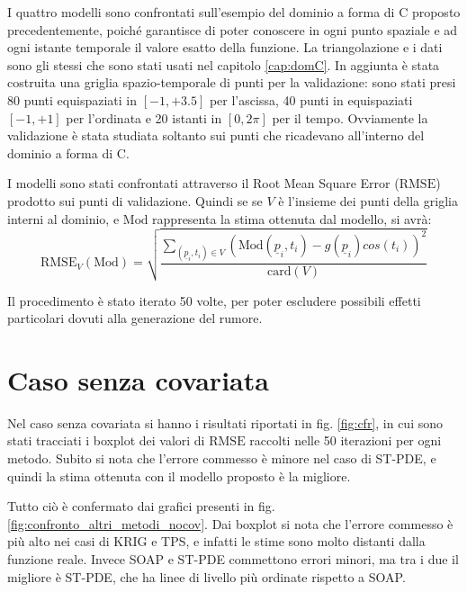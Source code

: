 \documentclass[a4paper,11pt,twoside,openright]{book}							%
\begin{document}
I quattro modelli sono confrontati sull'esempio del dominio a forma di C proposto precedentemente, poiché garantisce di poter conoscere in ogni punto spaziale e ad ogni istante temporale il valore esatto della funzione. La triangolazione e i dati sono gli stessi che sono stati usati nel capitolo \ref{cap:domC}. In aggiunta è stata costruita una griglia spazio-temporale di punti per la validazione: sono stati presi 80 punti equispaziati in $[-1,+3.5]$ per l'ascissa, 40 punti in equispaziati $[-1,+1]$ per l'ordinata e 20 istanti in $[0,2\pi]$ per il tempo. Ovviamente la validazione è stata studiata soltanto sui punti che ricadevano all'interno del dominio a forma di C.

I modelli sono stati confrontati attraverso il Root Mean Square Error ($\mathrm{RMSE}$) prodotto sui punti di validazione. Quindi se se $V$ è l'insieme dei punti della griglia interni al dominio, e $\mathrm{Mod}$ rappresenta la stima ottenuta dal modello, si avrà:
$$
\mathrm{RMSE}_V(\mathrm{Mod})=\sqrt{\frac{\sum_{(\underline p_i,t_i)\in V} (\mathrm{Mod}(\underline p_i,t_i)-g(\underline p_i)cos(t_i))^2}{\mathrm{card}(V)}}
$$ 

Il procedimento è stato iterato 50 volte, per poter escludere possibili effetti particolari dovuti alla generazione del rumore.

\newpage
\section{Caso senza covariata}
Nel caso senza covariata si hanno i risultati riportati in fig. \ref{fig:cfr}, in cui sono stati tracciati i boxplot dei valori di $\mathrm{RMSE}$ raccolti nelle 50 iterazioni per ogni metodo. Subito si nota che l'errore commesso è minore nel caso di ST-PDE, e quindi la stima ottenuta con il modello proposto è la migliore.

Tutto ciò è confermato dai grafici presenti in fig. \ref{fig:confronto_altri_metodi_nocov}. Dai boxplot si nota che l'errore commesso è più alto nei casi di KRIG e TPS, e infatti le stime sono molto distanti dalla funzione reale. Invece SOAP e ST-PDE commettono errori minori, ma tra i due il migliore è ST-PDE, che ha linee di livello più ordinate rispetto a SOAP. 
\end{document}
